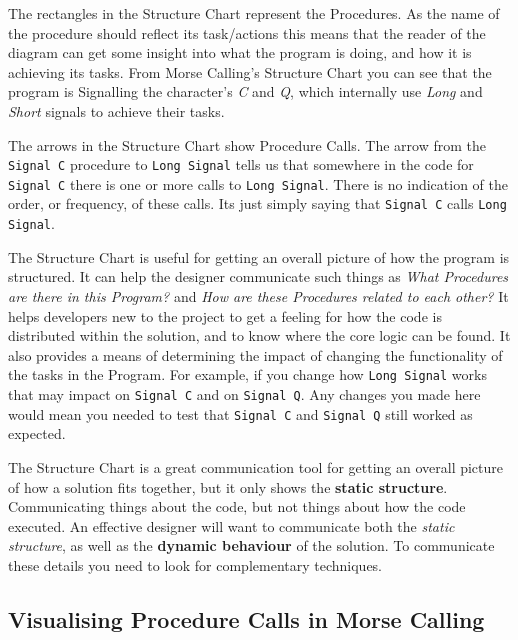 The rectangles in the Structure Chart represent the Procedures. As the name of the procedure should reflect its task/actions this means that the reader of the diagram can get some insight into what the program is doing, and how it is achieving its tasks. From Morse Calling's Structure Chart you can see that the program is Signalling the character's \emph{C} and \emph{Q}, which internally use \emph{Long} and \emph{Short} signals to achieve their tasks.

The arrows in the Structure Chart show Procedure Calls. The arrow from the \texttt{Signal C} procedure to \texttt{Long Signal} tells us that somewhere in the code for \texttt{Signal C} there is one or more calls to \texttt{Long Signal}. There is no indication of the order, or frequency, of these calls. Its just simply saying that \texttt{Signal C} calls \texttt{Long Signal}.

The Structure Chart is useful for getting an overall picture of how the program is structured. It can help the designer communicate such things as \emph{What Procedures are there in this Program?} and \emph{How are these Procedures related to each other?} It helps developers new to the project to get a feeling for how the code is distributed within the solution, and to know where the core logic can be found. It also provides a means of determining the impact of changing the functionality of the tasks in the Program. For example, if you change how \texttt{Long Signal} works that may impact on \texttt{Signal C} and on \texttt{Signal Q}. Any changes you made here would mean you needed to test that \texttt{Signal C} and \texttt{Signal Q} still worked as expected.

\bigskip

The Structure Chart is a great communication tool for getting an overall picture of how a solution fits together, but it only shows the \textbf{static structure}. Communicating things about the code, but not things about how the code executed. An effective designer will want to communicate both the \emph{static structure}, as well as the \textbf{dynamic behaviour} of the solution. To communicate these details you need to look for complementary techniques.


\subsection{Visualising Procedure Calls in Morse Calling} %
\label{sub:visualising_procedure_calls_in_morse_calling}

